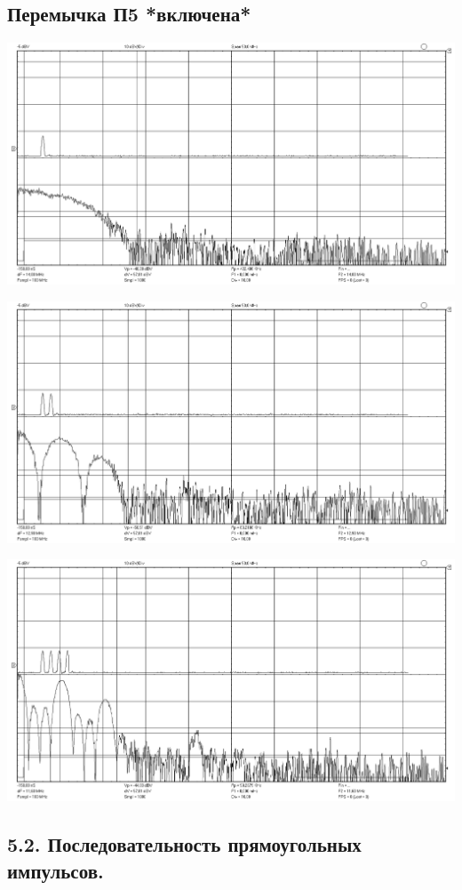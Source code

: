 \documentclass[12pt,a4paper]{article}
\begin{document}
\subsection*{Перемычка П5 *включена*}
\begin{center}
	\includegraphics[width=.8\linewidth]{data/51_n1_p5}\hfill
\end{center}	
\begin{center}
	\includegraphics[width=.8\linewidth]{data/51_n2_p5}\hfill
\end{center}	
\begin{center}
	\includegraphics[width=.8\linewidth]{data/51_n4_p5}\hfill
\end{center}	

\subsection*{5.2. Последовательность прямоугольных импульсов.}
\vspace*{20pt}
\end{document}
